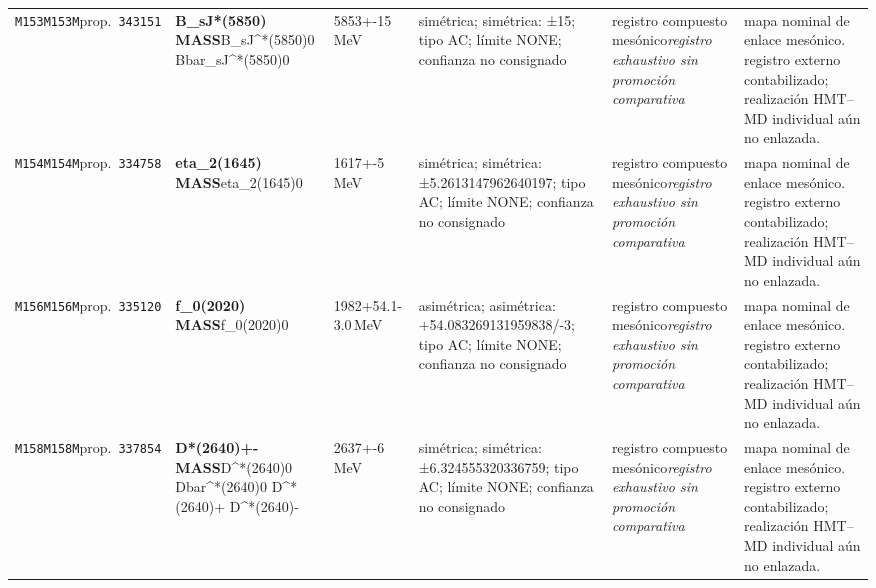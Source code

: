 \begin{landscape}
\begin{longtable}{L{1.85cm}L{4.45cm}L{2.35cm}L{4.05cm}L{3.35cm}L{7.15cm}}
\texttt{M153}\newline \texttt{M153M}\newline prop.\ \texttt{343151} & \textbf{B\_\allowbreak{}sJ*(5850) MASS}\newline B\_\allowbreak{}sJ\textasciicircum{}*(5850)0 \textbar{}\allowbreak{} Bbar\_\allowbreak{}sJ\textasciicircum{}*(5850)0 & 5853+-15\,MeV & simétrica; simétrica: ±15; tipo AC; límite NONE; confianza no consignado & registro compuesto mesónico\newline \emph{registro exhaustivo sin promoción comparativa} & mapa nominal de enlace mesónico. registro externo contabilizado; realización HMT--MD individual aún no enlazada. \\
\texttt{M154}\newline \texttt{M154M}\newline prop.\ \texttt{334758} & \textbf{eta\_\allowbreak{}2(1645) MASS}\newline eta\_\allowbreak{}2(1645)0 & 1617+-5\,MeV & simétrica; simétrica: ±5.2613147962640197; tipo AC; límite NONE; confianza no consignado & registro compuesto mesónico\newline \emph{registro exhaustivo sin promoción comparativa} & mapa nominal de enlace mesónico. registro externo contabilizado; realización HMT--MD individual aún no enlazada. \\
\texttt{M156}\newline \texttt{M156M}\newline prop.\ \texttt{335120} & \textbf{f\_\allowbreak{}0(2020) MASS}\newline f\_\allowbreak{}0(2020)0 & 1982+54.1-3.0\,MeV & asimétrica; asimétrica: +54.083269131959838/-3; tipo AC; límite NONE; confianza no consignado & registro compuesto mesónico\newline \emph{registro exhaustivo sin promoción comparativa} & mapa nominal de enlace mesónico. registro externo contabilizado; realización HMT--MD individual aún no enlazada. \\
\texttt{M158}\newline \texttt{M158M}\newline prop.\ \texttt{337854} & \textbf{D*(2640)+- MASS}\newline D\textasciicircum{}*(2640)0 \textbar{}\allowbreak{} Dbar\textasciicircum{}*(2640)0 \textbar{}\allowbreak{} D\textasciicircum{}*(2640)+ \textbar{}\allowbreak{} D\textasciicircum{}*(2640)- & 2637+-6\,MeV & simétrica; simétrica: ±6.324555320336759; tipo AC; límite NONE; confianza no consignado & registro compuesto mesónico\newline \emph{registro exhaustivo sin promoción comparativa} & mapa nominal de enlace mesónico. registro externo contabilizado; realización HMT--MD individual aún no enlazada. \\

\end{longtable}
\end{landscape}
